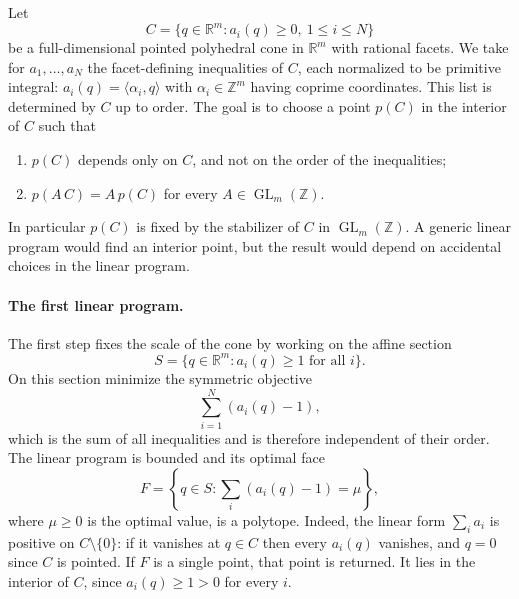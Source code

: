 \documentclass{amsart}
\newcommand{\GL}{\operatorname{GL}}
\newcommand{\ZZ}{\mathbb{Z}}
\newcommand{\RR}{\mathbb{R}}
\begin{document}
Let
\begin{equation}
  C=\{q\in\RR^m : a_i(q)\geq 0,\ 1\leq i\leq N\}
\end{equation}
be a full-dimensional pointed polyhedral cone in \(\RR^m\) with rational
facets.  We take for \(a_1,\ldots,a_N\) the facet-defining inequalities of
\(C\), each normalized to be primitive integral: \(a_i(q)=\langle
\alpha_i,q\rangle\) with \(\alpha_i\in\ZZ^m\) having coprime coordinates.
This list is determined by \(C\) up to order.  The goal is to choose a point
\(p(C)\) in the interior of \(C\) such that
\begin{enumerate}[label=(\roman*)]
  \item \(p(C)\) depends only on \(C\), and not on the order of the
        inequalities;
  \item \(p(A\,C)=A\,p(C)\) for every \(A\in\GL_m(\ZZ)\).
\end{enumerate}
In particular \(p(C)\) is fixed by the stabilizer of \(C\) in
\(\GL_m(\ZZ)\).  A generic linear program would find an interior point, but
the result would depend on accidental choices in the linear program.

\paragraph{The first linear program.}
The first step fixes the scale of the cone by working on the affine section
\begin{equation}
  S=\{q\in\RR^m : a_i(q)\geq 1 \text{ for all } i\}.
\end{equation}
On this section minimize the symmetric objective
\begin{equation}\label{eq:sym_objective}
  \sum_{i=1}^{N} (a_i(q)-1),
\end{equation}
which is the sum of all inequalities and is therefore independent of their
order.  The linear program is bounded and its optimal face
\begin{equation}
  F=\left\{q\in S : \sum_i(a_i(q)-1)=\mu\right\},
\end{equation}
where \(\mu\geq 0\) is the optimal value, is a polytope.  Indeed, the linear
form \(\sum_i a_i\) is positive on \(C\setminus\{0\}\): if it vanishes at
\(q\in C\) then every \(a_i(q)\) vanishes, and \(q=0\) since \(C\) is
pointed.  If \(F\) is a single point, that point is returned.  It lies in the
interior of \(C\), since \(a_i(q)\geq 1>0\) for every \(i\).
\end{document}
